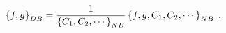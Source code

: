 \begin{equation}
\left\{  f,g\right\}  _{{\footnotesize DB}}=\frac{1}{\left\{  C_{1}%
,C_{2},\cdots\right\}  _{{\footnotesize NB}}}\left\{  f,g,C_{1},C_{2}%
,\cdots\right\}  _{{\footnotesize NB}}\;. \label{DBasNB}%
\end{equation}

